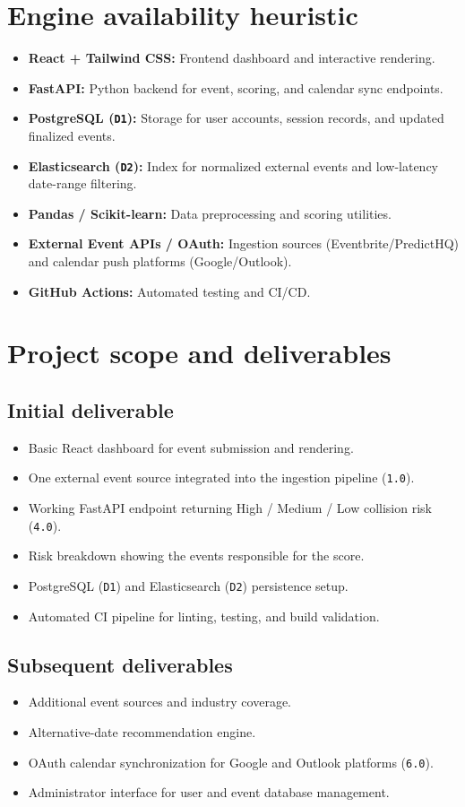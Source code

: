 \documentclass[12pt]{article}
\begin{document}
\section{Engine availability heuristic}
\begin{itemize}[leftmargin=0.7cm]
\item \textbf{React + Tailwind CSS:} Frontend dashboard and interactive rendering.
\item \textbf{FastAPI:} Python backend for event, scoring, and calendar sync endpoints.
\item \textbf{PostgreSQL (\texttt{D1}):} Storage for user accounts, session records, and updated finalized events.
\item \textbf{Elasticsearch (\texttt{D2}):} Index for normalized external events and low-latency date-range filtering.
\item \textbf{Pandas / Scikit-learn:} Data preprocessing and scoring utilities.
\item \textbf{External Event APIs / OAuth:} Ingestion sources (Eventbrite/PredictHQ) and calendar push platforms (Google/Outlook).
\item \textbf{GitHub Actions:} Automated testing and CI/CD.
\end{itemize}

\section{Project scope and deliverables}
\subsection{Initial deliverable}
\begin{itemize}[leftmargin=0.7cm]
\item Basic React dashboard for event submission and rendering.
\item One external event source integrated into the ingestion pipeline (\texttt{1.0}).
\item Working FastAPI endpoint returning High / Medium / Low collision risk (\texttt{4.0}).
\item Risk breakdown showing the events responsible for the score.
\item PostgreSQL (\texttt{D1}) and Elasticsearch (\texttt{D2}) persistence setup.
\item Automated CI pipeline for linting, testing, and build validation.
\end{itemize}

\subsection{Subsequent deliverables}
\begin{itemize}[leftmargin=0.7cm]
\item Additional event sources and industry coverage.
\item Alternative-date recommendation engine.
\item OAuth calendar synchronization for Google and Outlook platforms (\texttt{6.0}).
\item Administrator interface for user and event database management.
\end{itemize}
\end{document}
